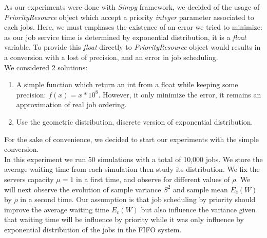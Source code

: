 \documentclass{article}
\begin{document}
    As our experiments were done with \emph{Simpy} framework, we decided of the usage of \emph{PriorityResource} object which accept a priority \emph{integer} parameter associated to each jobs.
    Here, we must emphases the existence of an error we tried to minimize: as our job service time is determined by exponential distribution, it is a \emph{float} variable. To provide this \emph{float} directly to \emph{PriorityResource} object would results in a conversion with a lost of precision, and an error in job scheduling.\\
    We considered 2 solutions:
    \begin{enumerate}
        \item A simple function which return an int from a float while keeping some precision: $f(x) = x * 10^8$. However, it only minimize the error, it remains an approximation of real job ordering.
        \item Use the geometric distribution, discrete version of exponential distribution.
    \end{enumerate}
    For the sake of convenience, we decided to start our experiments with the simple conversion.\\

    In this experiment we run 50 simulations with a total of 10,000 jobs. We store the average waiting time from each simulation then study its distribution. We fix the servers capacity $\mu = 1$ in a first time, and observe for different values of $\rho$. We will next observe the evolution of sample variance $S^2$ and sample mean $E_c(W)$ by $\rho$ in a second time.
    Our assumption is that job scheduling by priority should improve the average waiting time $E_c(W)$ but also influence the variance given that waiting time will be influence by priority while it was only influence by exponential distribution of the jobs in the FIFO system.
\end{document}
